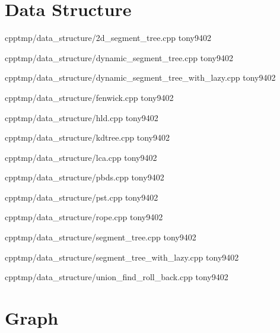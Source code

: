 \section{Data Structure}


{}
{}
{}
{cpp}{tmp/data_structure/2d_segment_tree.cpp}
{tony9402}



{}
{}
{}
{cpp}{tmp/data_structure/dynamic_segment_tree.cpp}
{tony9402}



{}
{}
{}
{cpp}{tmp/data_structure/dynamic_segment_tree_with_lazy.cpp}
{tony9402}



{}
{}
{}
{cpp}{tmp/data_structure/fenwick.cpp}
{tony9402}



{}
{}
{}
{cpp}{tmp/data_structure/hld.cpp}
{tony9402}



{}
{}
{}
{cpp}{tmp/data_structure/kdtree.cpp}
{tony9402}



{}
{}
{}
{cpp}{tmp/data_structure/lca.cpp}
{tony9402}



{}
{}
{}
{cpp}{tmp/data_structure/pbds.cpp}
{tony9402}



{}
{}
{}
{cpp}{tmp/data_structure/pst.cpp}
{tony9402}



{}
{}
{}
{cpp}{tmp/data_structure/rope.cpp}
{tony9402}



{}
{}
{}
{cpp}{tmp/data_structure/segment_tree.cpp}
{tony9402}



{}
{}
{}
{cpp}{tmp/data_structure/segment_tree_with_lazy.cpp}
{tony9402}



{}
{}
{}
{cpp}{tmp/data_structure/union_find_roll_back.cpp}
{tony9402}


\section{Graph}


